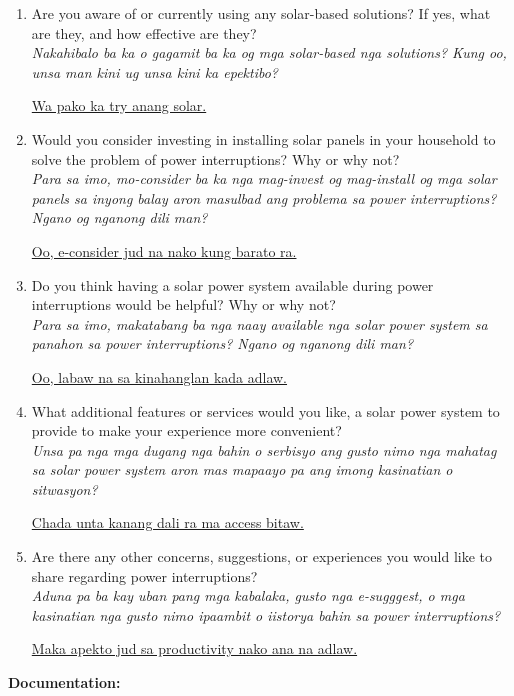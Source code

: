 \begin{mdframed}
\begin{enumerate}[label=\textbf{\arabic*.}, itemsep=1em]
\item Are you aware of or currently using any solar-based solutions? If yes, what are they, and how effective are they?   
\\ \textit{Nakahibalo ba ka o gagamit ba ka og mga solar-based nga solutions? Kung oo, unsa man kini ug unsa kini ka epektibo?}
\\ \parbox{\linewidth}{\uline{Wa pako ka try anang solar.}}

\item Would you consider investing in installing solar panels in your household to solve the problem of power interruptions? Why or why not?    
\\ \textit{Para sa imo, mo-consider ba ka nga mag-invest og mag-install og mga solar panels sa inyong balay aron masulbad ang problema sa power interruptions? Ngano og nganong dili man?}
\\ \parbox{\linewidth}{\uline{Oo, e-consider jud na nako kung barato ra.}}

\item Do you think having a solar power system available during power interruptions would be helpful? Why or why not?    
\\ \textit{Para sa imo, makatabang ba nga naay available nga solar power system sa panahon sa power interruptions? Ngano og nganong dili man?}
\\ \parbox{\linewidth}{\uline{Oo, labaw na sa kinahanglan kada adlaw.}}

\item What additional features or services would you like, a solar power system to provide to make your experience more convenient? 
\\ \textit{Unsa pa nga mga dugang nga bahin o serbisyo ang gusto nimo nga mahatag sa solar power system aron mas mapaayo pa ang imong kasinatian o sitwasyon?}
\\ \parbox{\linewidth}{\uline{Chada unta kanang dali ra ma access bitaw.}}

\item Are there any other concerns, suggestions, or experiences you would like to share regarding power interruptions? 
\\ \textit{Aduna pa ba kay uban pang mga kabalaka, gusto nga e-sugggest, o mga kasinatian nga gusto nimo ipaambit o iistorya bahin sa power interruptions?}
\\ \parbox{\linewidth}{\uline{Maka apekto jud sa productivity nako ana na adlaw.}}

\end{enumerate}

\vspace{10pt}
\noindent \textbf{Documentation:}
\hrulespace 

\end{mdframed}